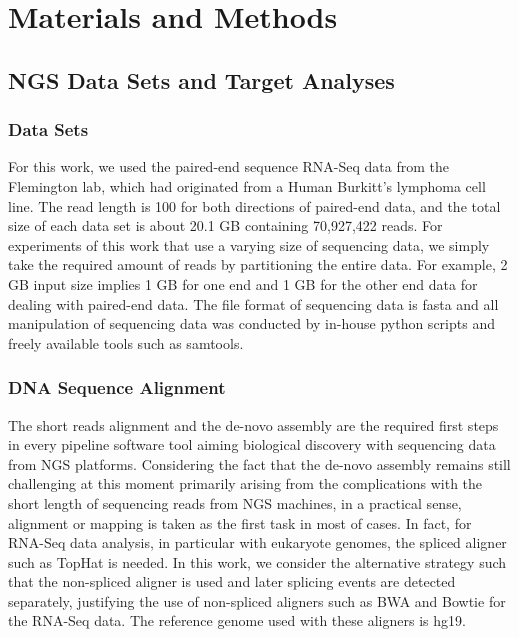 \documentclass{acm_proc_article-sp}
\begin{document}
\section{Materials and Methods}\label{sec:materials_and_methods}
\subsection{NGS Data Sets and Target Analyses}
\subsubsection{Data Sets}

For this work, we used the paired-end sequence RNA-Seq data from the Flemington lab, which had originated from a Human Burkitt's lymphoma cell line\cite{erik_2010}.  The read length is 100 for both directions of paired-end data, and the total size of each data set is about 20.1 GB containing 70,927,422 reads.  For experiments of this work that use a varying size of sequencing data, we simply take the required amount of reads by partitioning the entire data.  For example, 2 GB input size implies 1 GB for one end and 1 GB for the other end data for dealing with paired-end data.  The file format of sequencing data is fasta and all manipulation of sequencing data was conducted by in-house python scripts and freely available tools such as samtools\cite{samtools}.  

\subsubsection{DNA Sequence Alignment}

The short reads alignment and the de-novo assembly are the required first steps in every pipeline software tool aiming biological discovery with sequencing data from NGS platforms.  Considering the fact that the de-novo assembly remains still challenging at this moment primarily arising from the complications with the short length of sequencing reads from NGS machines, in a practical sense, alignment or mapping is taken as the first task in most of cases.  In fact, for RNA-Seq data analysis, in particular with eukaryote genomes, the spliced aligner such as TopHat\cite{pepke2009} is needed. In this work, we consider the alternative strategy such that the non-spliced aligner is used and later splicing events are detected separately, justifying the use of non-spliced aligners such as BWA and Bowtie for the RNA-Seq data.  The reference genome used with these aligners is hg19.
\end{document}
